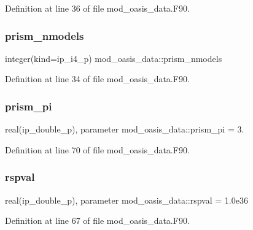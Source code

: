 Definition at line 36 of file mod\+\_\+oasis\+\_\+data.\+F90.

\mbox{\label{namespacemod__oasis__data_a5915b02f461626d5a6cffbf037daa75e}} 
\subsubsection{\texorpdfstring{prism\+\_\+nmodels}{prism\_nmodels}}
{\footnotesize\ttfamily integer(kind=ip\+\_\+i4\+\_\+p) mod\+\_\+oasis\+\_\+data\+::prism\+\_\+nmodels}



Definition at line 34 of file mod\+\_\+oasis\+\_\+data.\+F90.

\mbox{\label{namespacemod__oasis__data_ad5c84ea4b3063c2a3883b6d6571afeb0}} 
\subsubsection{\texorpdfstring{prism\+\_\+pi}{prism\_pi}}
{\footnotesize\ttfamily real(ip\+\_\+double\+\_\+p), parameter mod\+\_\+oasis\+\_\+data\+::prism\+\_\+pi = 3.}



Definition at line 70 of file mod\+\_\+oasis\+\_\+data.\+F90.

\mbox{\label{namespacemod__oasis__data_a3fea2837639caadabd693f405693edbb}} 
\subsubsection{\texorpdfstring{rspval}{rspval}}
{\footnotesize\ttfamily real(ip\+\_\+double\+\_\+p), parameter mod\+\_\+oasis\+\_\+data\+::rspval = 1.\+0e36}



Definition at line 67 of file mod\+\_\+oasis\+\_\+data.\+F90.

